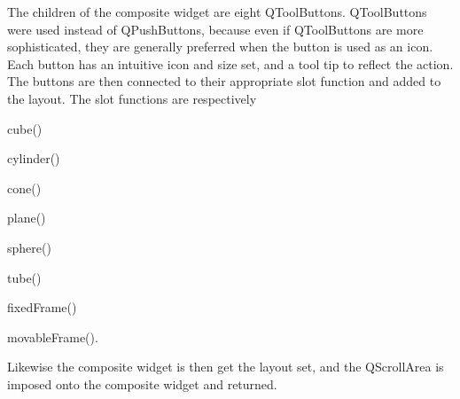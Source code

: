 The children of the composite widget are eight QToolButtons. QToolButtons were used instead of QPushButtons, because even if QToolButtons are more sophisticated, they are generally preferred when the button is used as an icon. Each button has an intuitive icon and size set, and a tool tip to reflect the action. The buttons are then connected to their appropriate slot function and added to the layout. The slot functions are respectively \begin{enumerate*}[font={\color{red!50!black}\bfseries}]
\item cube()
\item cylinder()
\item cone()
\item plane()
\item sphere()
\item tube()
\item fixedFrame()
\item movableFrame().
\end{enumerate*}    
Likewise the composite widget is then get the layout set, and the QScrollArea is imposed onto the composite widget and returned.
%
%  

